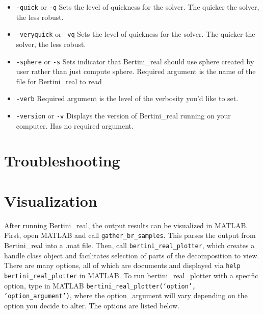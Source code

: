 \documentclass[10pt]{article}
\begin{document}
\begin {itemize}
\item \texttt{-quick} or \texttt{-q} \newline Sets the level of quickness for the solver. The quicker the solver, the less robust. 
\item \texttt{-veryquick} or \texttt{-vq} \newline Sets the level of quickness for the solver. The quicker the solver, the less robust. 
\item \texttt{-sphere} or \texttt{-s} \newline Sets indicator that Bertini\_real should use sphere created by user rather than just compute sphere. Required argument is the name of the file for Bertini\_real to read
\item \texttt{-verb} \newline Required argument is the level of the verbosity you'd like to set.
\item \texttt{-version} or \texttt{-v} \newline Displays the version of Bertini\_real running on your computer. Has no required argument. 
\end{itemize}



\section{Troubleshooting}

\section{Visualization}
After running Bertini\_real, the output results can be visualized in MATLAB. First, open MATLAB and call \texttt{gather\_br\_samples}. This parses the output from Bertini\_real into a .mat file. Then, call \texttt{bertini\_real\_plotter}, which creates a handle class object and facilitates selection of parts of the decomposition to view. There are many options, all of which are documents and displayed via \texttt{help bertini\_real\_plotter} in MATLAB. To run bertini\_real\_plotter with a specific option, type in MATLAB \texttt{bertini\_real\_plotter(`option', `option\_argument')}, where the option\_argument will vary depending on the option you decide to alter. The options are listed below. 
\end{document}
